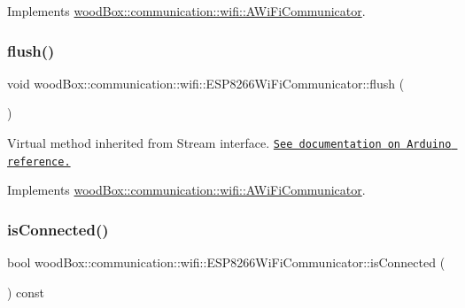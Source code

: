 Implements \mbox{\hyperlink{classwood_box_1_1communication_1_1wifi_1_1_a_wi_fi_communicator_aeb87d8a22ad08c929c28191a4c725a5b}{wood\+Box\+::communication\+::wifi\+::\+A\+Wi\+Fi\+Communicator}}.

\mbox{\label{classwood_box_1_1communication_1_1wifi_1_1_e_s_p8266_wi_fi_communicator_a523aec958ef48fa917621a560d964f40}} 
\subsubsection{\texorpdfstring{flush()}{flush()}}
{\footnotesize\ttfamily void wood\+Box\+::communication\+::wifi\+::\+E\+S\+P8266\+Wi\+Fi\+Communicator\+::flush (\begin{DoxyParamCaption}{ }\end{DoxyParamCaption})\hspace{0.3cm}{\ttfamily [virtual]}}

Virtual method inherited from Stream interface. \href{https://www.arduino.cc/reference/en/language/functions/communication/stream/streamflush/}{\tt See documentation on Arduino reference.} 

Implements \mbox{\hyperlink{classwood_box_1_1communication_1_1wifi_1_1_a_wi_fi_communicator_a1c74b8bc27a89604b4b7daa94c0168a6}{wood\+Box\+::communication\+::wifi\+::\+A\+Wi\+Fi\+Communicator}}.

\mbox{\label{classwood_box_1_1communication_1_1wifi_1_1_e_s_p8266_wi_fi_communicator_a2a1d8b14bca4b6964f043b874d23090c}} 
\subsubsection{\texorpdfstring{is\+Connected()}{isConnected()}}
{\footnotesize\ttfamily bool wood\+Box\+::communication\+::wifi\+::\+E\+S\+P8266\+Wi\+Fi\+Communicator\+::is\+Connected (\begin{DoxyParamCaption}{ }\end{DoxyParamCaption}) const\hspace{0.3cm}{\ttfamily [virtual]}}

